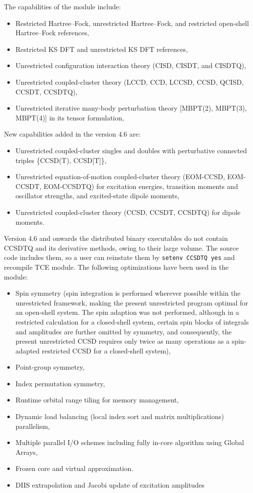 The capabilities of the module include:
\begin{itemize}
\item Restricted Hartree--Fock, unrestricted Hartree--Fock, and restricted open-shell
Hartree--Fock references,
\item Restricted KS DFT and unrestricted KS DFT references,
\item Unrestricted configuration interaction theory (CISD, CISDT, and CISDTQ),
\item Unrestricted coupled-cluster theory (LCCD, CCD, LCCSD, CCSD, QCISD, CCSDT, CCSDTQ),
\item Unrestricted iterative many-body perturbation theory [MBPT(2), MBPT(3), MBPT(4)] in its tensor formulation,
\end{itemize}
New capabilities added in the version 4.6 are:
\begin{itemize}
\item Unrestricted coupled-cluster singles and doubles with perturbative connected triples \{CCSD(T), CCSD[T]\},
\item Unrestricted equation-of-motion coupled-cluster theory (EOM-CCSD, EOM-CCSDT, EOM-CCSDTQ) for excitation energies, transition moments and oscillator strengths, and excited-state dipole moments,
\item Unrestricted coupled-cluster theory (CCSD, CCSDT, CCSDTQ) for dipole moments.
\end{itemize}
Version 4.6 and onwards the distributed binary executables do not contain CCSDTQ and its
derivative methods, owing to their large volume.  The source code includes them, so a user
can reinstate them by \verb+setenv CCSDTQ yes+ and recompile TCE module.
The following optimizations have been used in the module:
\begin{itemize}
\item Spin symmetry (spin integration is performed wherever possible within the
unrestricted framework, making the present unrestricted program 
optimal for an open-shell system.  The spin adaption was not performed, 
although in a restricted calculation for a closed-shell system, certain spin blocks of 
integrals and amplitudes are further omitted by symmetry, and
consequently, the present unrestricted CCSD requires only twice
as many operations as a spin-adapted restricted CCSD for a closed-shell system),
\item Point-group symmetry,
\item Index permutation symmetry,
\item Runtime orbital range tiling for memory management,
\item Dynamic load balancing (local index sort and matrix multiplications) parallelism,
\item Multiple parallel I/O schemes including fully in-core algorithm using Global Arrays,
\item Frozen core and virtual approximation.
\item DIIS extrapolation and Jacobi update of excitation amplitudes
\end{itemize}

